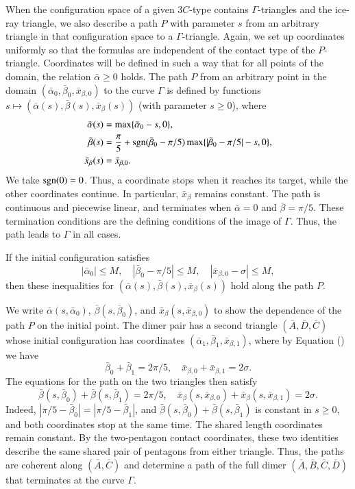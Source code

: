 When the configuration space of a given $3C$-type contains
$\Gamma$-triangles and the ice-ray triangle, we also describe a path
$P$ with parameter $s$ from an arbitrary triangle in that
configuration space to a $\Gamma$-triangle.  Again, we set up
coordinates uniformly so that the formulas are independent of the
contact type of the $P$-triangle.  Coordinates will be defined in such
a way that for all points of the domain, the relation $\bar\alpha\ge
0$ holds.  The path $P$ from an arbitrary point in the domain
$(\bar\alpha_0,\bar\beta_0,\bar x_{\beta,0})$ to the curve $\Gamma$ is
defined by functions $s\mapsto (\bar\alpha(s),\bar\beta(s),\bar
x_\beta(s))$ (with parameter $s\ge 0$), where
\begin{align*}
\bar\alpha(s)&=\max\{\bar\alpha_0-s,0\},\\
\bar\beta(s)&=\frac\pi5+\op{sgn}(\bar\beta_0-\pi/5)
                  \max\{|\bar\beta_0-\pi/5|-s,0\},\\ %
\bar x_\beta(s)&=\bar x_{\beta,0}.
\end{align*}
We take ${\operatorname{sgn}}(0)=0$.  Thus, a coordinate stops when it reaches
its target, while the other coordinates continue.  In particular,
$\bar x_\beta$ remains constant.  The path is continuous and
piecewise linear, and terminates when $\bar\alpha=0$ and
$\bar\beta=\pi/5$.  These
termination conditions are the defining conditions of the image of
$\Gamma$.  Thus, the path leads to $\Gamma$ in all cases.

If the initial configuration satisfies
\[
|\bar\alpha_0|\le M,\quad 
|\bar\beta_0-\pi/5|\le M,\quad |\bar x_{\beta,0}-\sigma|\le M,
\]
then these inequalities for $(\bar\alpha(s),\bar\beta(s),\bar
x_\beta(s))$ hold along the path $P$.

We write $\bar\alpha(s,\bar\alpha_0)$, $\bar\beta(s,\bar\beta_0)$, and
$\bar x_\beta(s,\bar x_{\beta,0})$ to show the dependence of the path
$P$ on the initial point.  The dimer pair has a second triangle $(\bar
A,\bar D,\bar C)$ whose initial configuration has coordinates
$(\bar\alpha_1,\bar\beta_1,\bar x_{\beta,1})$, where by Equation
() we have
\[
\bar\beta_0+\bar\beta_1 = 2\pi/5,\quad 
\bar x_{\beta,0}+\bar x_{\beta,1} = 2\sigma.
\]
The equations for the path on the two triangles then satisfy
\[
\bar\beta(s,\bar\beta_0)+\bar\beta(s,\bar\beta_1)=2\pi/5,\quad
\bar x_{\beta}(s,\bar x_{\beta,0}) + \bar x_{\beta}(s,\bar x_{\beta,1}) = 2\sigma.
\]
Indeed, $|\pi/5-\bar\beta_0|=|\pi/5-\bar\beta_1|$, and
$\bar\beta(s,\bar\beta_0)+\bar\beta(s,\bar\beta_1)$ is constant
in $s\ge0$, %
and both coordinates stop at the same time.
The shared
length coordinates remain constant.  By the
two-pentagon contact coordinates, these two identities describe the
same shared pair of pentagons from either triangle.  Thus, the paths
are coherent along $(\bar A,\bar C)$ and determine a path of the full
dimer $(\bar A,\bar B,\bar C,\bar D)$ that terminates at the curve
$\Gamma$.

